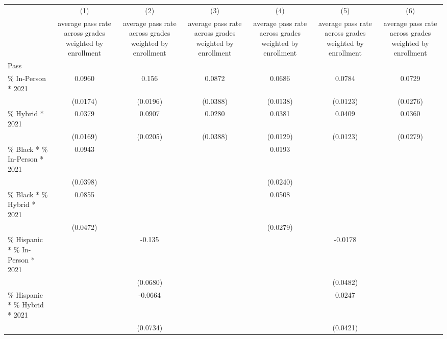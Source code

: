 \begin{tabular}{l*{6}{c}}
\hline\hline
                    &\multicolumn{1}{c}{(1)}&\multicolumn{1}{c}{(2)}&\multicolumn{1}{c}{(3)}&\multicolumn{1}{c}{(4)}&\multicolumn{1}{c}{(5)}&\multicolumn{1}{c}{(6)}\\
                    &\multicolumn{1}{c}{average pass rate across grades weighted by enrollment}&\multicolumn{1}{c}{average pass rate across grades weighted by enrollment}&\multicolumn{1}{c}{average pass rate across grades weighted by enrollment}&\multicolumn{1}{c}{average pass rate across grades weighted by enrollment}&\multicolumn{1}{c}{average pass rate across grades weighted by enrollment}&\multicolumn{1}{c}{average pass rate across grades weighted by enrollment}\\
Pass                &            &            &            &            &            &            \\
\hline
\% In-Person * 2021 &      0.0960&       0.156&      0.0872&      0.0686&      0.0784&      0.0729\\
                    &    (0.0174)&    (0.0196)&    (0.0388)&    (0.0138)&    (0.0123)&    (0.0276)\\
[1em]
\% Hybrid * 2021    &      0.0379&      0.0907&      0.0280&      0.0381&      0.0409&      0.0360\\
                    &    (0.0169)&    (0.0205)&    (0.0388)&    (0.0129)&    (0.0123)&    (0.0279)\\
[1em]
\% Black * \% In-Person * 2021&      0.0943&            &            &      0.0193&            &            \\
                    &    (0.0398)&            &            &    (0.0240)&            &            \\
[1em]
\% Black * \% Hybrid * 2021&      0.0855&            &            &      0.0508&            &            \\
                    &    (0.0472)&            &            &    (0.0279)&            &            \\
[1em]
\% Hispanic * \% In-Person * 2021&            &      -0.135&            &            &     -0.0178&            \\
                    &            &    (0.0680)&            &            &    (0.0482)&            \\
[1em]
\% Hispanic * \% Hybrid * 2021&            &     -0.0664&            &            &      0.0247&            \\
                    &            &    (0.0734)&            &            &    (0.0421)&            \\

\end{tabular}
